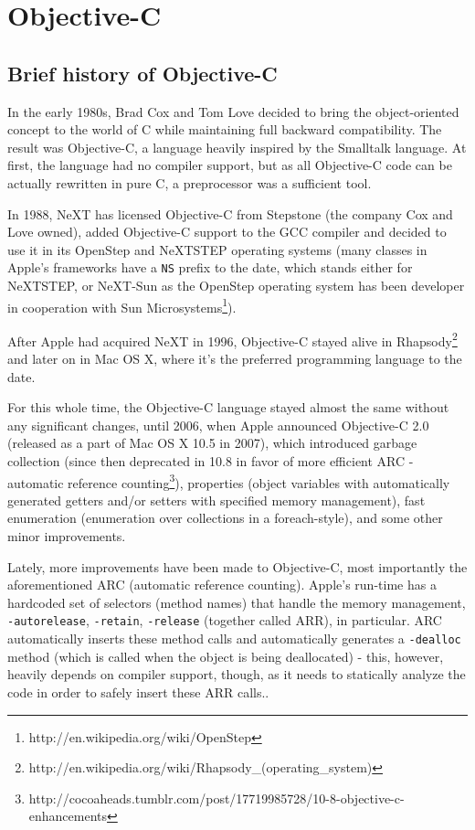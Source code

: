 \chapter{Objective-C}
  
\section{Brief history of Objective-C}

In the early 1980s, Brad Cox and Tom Love decided to bring the object-oriented concept to the world of C while maintaining full backward compatibility. The result was Objective-C, a language heavily inspired by the Smalltalk language. At first, the language had no compiler support, but as all Objective-C code can be actually rewritten in pure C, a preprocessor was a sufficient tool.

In 1988, NeXT has licensed Objective-C from Stepstone (the company Cox and Love owned), added Objective-C support to the GCC compiler and decided to use it in its OpenStep and NeXTSTEP operating systems (many classes in Apple's frameworks have a \verb=NS= prefix to the date, which stands either for NeXTSTEP, or NeXT-Sun as the OpenStep operating system has been developer in cooperation with Sun Microsystems\footnote{http://en.wikipedia.org/wiki/OpenStep}).

After Apple had acquired NeXT in 1996, Objective-C stayed alive in Rhapsody\footnote{http://en.wikipedia.org/wiki/Rhapsody\_(operating\_system)} and later on in Mac OS X, where it's the preferred programming language to the date.

For this whole time, the Objective-C language stayed almost the same without any significant changes, until 2006, when Apple announced Objective-C 2.0 (released as a part of Mac OS X 10.5 in 2007), which introduced garbage collection (since then deprecated in 10.8 in favor of more efficient ARC - automatic reference counting\footnote{http://cocoaheads.tumblr.com/post/17719985728/10-8-objective-c-enhancements}), properties (object variables with automatically generated getters and/or setters with specified memory management), fast enumeration (enumeration over collections in a foreach-style), and some other minor improvements.

Lately, more improvements have been made to Objective-C, most importantly the aforementioned ARC (automatic reference counting). Apple's run-time has a hardcoded set of selectors (method names) that handle the memory management, \verb=-autorelease=, \verb=-retain=, \verb=-release= (together called ARR), in particular. ARC automatically inserts these method calls and automatically generates a \verb=-dealloc= method (which is called when the object is being deallocated) - this, however, heavily depends on compiler support, though, as it needs to statically analyze the code in order to safely insert these ARR calls..

